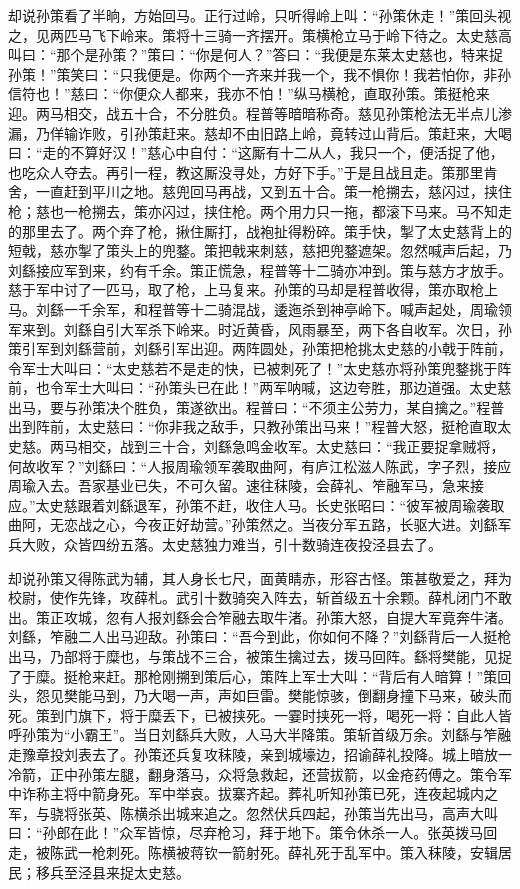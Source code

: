 却说孙策看了半晌，方始回马。正行过岭，只听得岭上叫：“孙策休走！”策回头视之，见两匹马飞下岭来。策将十三骑一齐摆开。策横枪立马于岭下待之。太史慈高叫曰：“那个是孙策？”策曰：“你是何人？”答曰：“我便是东莱太史慈也，特来捉孙策！”策笑曰：“只我便是。你两个一齐来并我一个，我不惧你！我若怕你，非孙信符也！”慈曰：“你便众人都来，我亦不怕！”纵马横枪，直取孙策。策挺枪来迎。两马相交，战五十合，不分胜负。程普等暗暗称奇。慈见孙策枪法无半点儿渗漏，乃佯输诈败，引孙策赶来。慈却不由旧路上岭，竟转过山背后。策赶来，大喝曰：“走的不算好汉！”慈心中自付：“这厮有十二从人，我只一个，便活捉了他，也吃众人夺去。再引一程，教这厮没寻处，方好下手。”于是且战且走。策那里肯舍，一直赶到平川之地。慈兜回马再战，又到五十合。策一枪搠去，慈闪过，挟住枪；慈也一枪搠去，策亦闪过，挟住枪。两个用力只一拖，都滚下马来。马不知走的那里去了。两个弃了枪，揪住厮打，战袍扯得粉碎。策手快，掣了太史慈背上的短戟，慈亦掣了策头上的兜鍪。策把戟来刺慈，慈把兜鍪遮架。忽然喊声后起，乃刘繇接应军到来，约有千余。策正慌急，程普等十二骑亦冲到。策与慈方才放手。慈于军中讨了一匹马，取了枪，上马复来。孙策的马却是程普收得，策亦取枪上马。刘繇一千余军，和程普等十二骑混战，逶迤杀到神亭岭下。喊声起处，周瑜领军来到。刘繇自引大军杀下岭来。时近黄昏，风雨暴至，两下各自收军。次日，孙策引军到刘繇营前，刘繇引军出迎。两阵圆处，孙策把枪挑太史慈的小戟于阵前，令军士大叫曰：“太史慈若不是走的快，已被刺死了！”太史慈亦将孙策兜鍪挑于阵前，也令军士大叫曰：“孙策头已在此！”两军呐喊，这边夸胜，那边道强。太史慈出马，要与孙策决个胜负，策遂欲出。程普曰：“不须主公劳力，某自擒之。”程普出到阵前，太史慈曰：“你非我之敌手，只教孙策出马来！”程普大怒，挺枪直取太史慈。两马相交，战到三十合，刘繇急鸣金收军。太史慈曰：“我正要捉拿贼将，何故收军？”刘繇曰：“人报周瑜领军袭取曲阿，有庐江松滋人陈武，字子烈，接应周瑜入去。吾家基业已失，不可久留。速往秣陵，会薛礼、笮融军马，急来接应。”太史慈跟着刘繇退军，孙策不赶，收住人马。长史张昭曰：“彼军被周瑜袭取曲阿，无恋战之心，今夜正好劫营。”孙策然之。当夜分军五路，长驱大进。刘繇军兵大败，众皆四纷五落。太史慈独力难当，引十数骑连夜投泾县去了。

却说孙策又得陈武为辅，其人身长七尺，面黄睛赤，形容古怪。策甚敬爱之，拜为校尉，使作先锋，攻薛札。武引十数骑突入阵去，斩首级五十余颗。薛札闭门不敢出。策正攻城，忽有人报刘繇会合笮融去取牛渚。孙策大怒，自提大军竟奔牛渚。刘繇，笮融二人出马迎敌。孙策曰：“吾今到此，你如何不降？”刘繇背后一人挺枪出马，乃部将于糜也，与策战不三合，被策生擒过去，拨马回阵。繇将樊能，见捉了于糜。挺枪来赶。那枪刚搠到策后心，策阵上军士大叫：“背后有人暗算！”策回头，怨见樊能马到，乃大喝一声，声如巨雷。樊能惊骇，倒翻身撞下马来，破头而死。策到门旗下，将于糜丢下，已被挟死。一霎时挟死一将，喝死一将：自此人皆呼孙策为“小霸王”。当日刘繇兵大败，人马大半降策。策斩首级万余。刘繇与笮融走豫章投刘表去了。孙策还兵复攻秣陵，亲到城壕边，招谕薛礼投降。城上暗放一冷箭，正中孙策左腿，翻身落马，众将急救起，还营拔箭，以金疮药傅之。策令军中诈称主将中箭身死。军中举哀。拔寨齐起。葬礼听知孙策已死，连夜起城内之军，与骁将张英、陈横杀出城来追之。忽然伏兵四起，孙策当先出马，高声大叫曰：“孙郎在此！”众军皆惊，尽弃枪习，拜于地下。策令休杀一人。张英拨马回走，被陈武一枪刺死。陈横被蒋钦一箭射死。薛礼死于乱军中。策入秣陵，安辑居民；移兵至泾县来捉太史慈。

